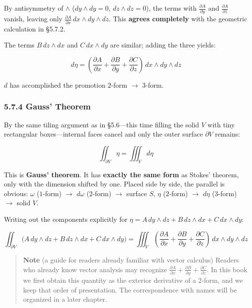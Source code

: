 By antisymmetry of \(\wedge\) (\(dy \wedge dy = 0\),
\(dz \wedge dz = 0\)), the terms with \(\frac{\partial A}{\partial y}\)
and \(\frac{\partial A}{\partial z}\) vanish, leaving only
\(\frac{\partial A}{\partial x}\,dx \wedge dy \wedge dz\). This
\textbf{agrees completely} with the geometric calculation in §5.7.2.

The terms \(B\,dz \wedge dx\) and \(C\,dx \wedge dy\) are similar;
adding the three yields:

\[d\eta = (\frac{\partial A}{\partial x} + \frac{\partial B}{\partial y} + \frac{\partial C}{\partial z})\,dx \wedge dy \wedge dz\]

\(d\) has accomplished the promotion \(2\)-form \(\to\) \(3\)-form.

\hypertarget{gauss-theorem}{%
\subsubsection{5.7.4 Gauss' Theorem}\label{gauss-theorem}}

By the same tiling argument as in §5.6---this time filling the solid
\(V\) with tiny rectangular boxes---internal faces cancel and only the
outer surface \(\partial V\) remains:

\[\iint_{\partial V} \eta = \iiint_V d\eta\]

This is \textbf{Gauss' theorem}. It has \textbf{exactly the same form}
as Stokes' theorem, only with the dimension shifted by one. Placed side
by side, the parallel is obvious: \(\omega\) (\(1\)-form) \(\to\)
\(d\omega\) (\(2\)-form) \(\to\) surface \(S\), \(\eta\) (\(2\)-form)
\(\to\) \(d\eta\) (\(3\)-form) \(\to\) solid \(V\).

Writing out the components explicitly for
\(\eta = A\,dy \wedge dz + B\,dz \wedge dx + C\,dx \wedge dy\):

\[\iint_{\partial V} \bigl(A\,dy \wedge dz + B\,dz \wedge dx + C\,dx \wedge dy\bigr) = \iiint_V (\frac{\partial A}{\partial x} + \frac{\partial B}{\partial y} + \frac{\partial C}{\partial z})\,dx \wedge dy \wedge dz\]

\begin{quote}
\textbf{Note} (a guide for readers already familiar with vector
calculus) Readers who already know vector analysis may recognize
\(\frac{\partial A}{\partial x}+\frac{\partial B}{\partial y}+\frac{\partial C}{\partial z}\).
In this book we first obtain this quantity as the exterior derivative of
a \(2\)-form, and we keep that order of presentation. The correspondence
with names will be organized in a later chapter.
\end{quote}


